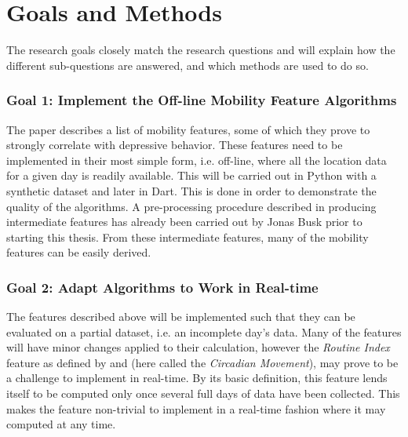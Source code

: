 \section{Goals and Methods}


The research goals closely match the research questions and will explain how the different sub-questions are answered, and which methods are used to do so.

\subsubsection*{Goal 1: Implement the Off-line Mobility Feature Algorithms}
The paper \cite{Saeb2015} describes a list of mobility features, some of which they prove to strongly correlate with depressive behavior. These features need to be implemented in their most simple form, i.e. off-line, where all the location data for a given day is readily available. This will be carried out in Python with a synthetic dataset and later in Dart. This is done in order to demonstrate the quality of the algorithms. A pre-processing procedure described in \cite{sparse-location-2014} producing intermediate features has already been carried out by Jonas Busk prior to starting this thesis. From these intermediate features, many of the mobility features can be easily derived. 

\subsubsection*{Goal 2: Adapt Algorithms to Work in Real-time}
The features described above will be implemented such that they can be evaluated on a partial dataset, i.e. an incomplete day's data. Many of the features will have minor changes applied to their calculation, however the \textit{Routine Index} feature as defined by \cite{extraction-of-behavioural-features} and \cite{Saeb2015}  (here called the\textit{ Circadian Movement}), may prove to be a challenge to implement in real-time. By its basic definition, this feature lends itself to be computed only once several full days of data have been collected. This makes the feature non-trivial to implement in a real-time fashion where it may computed at any time. 

